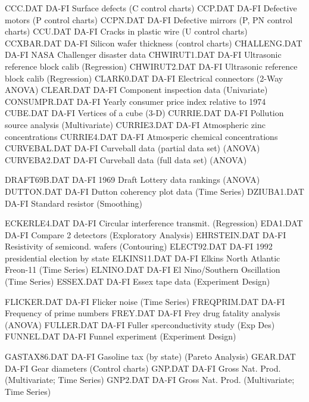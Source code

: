CCC.DAT                     DA-FI Surface defects (C control charts)
CCP.DAT                     DA-FI Defective motors (P control charts)
CCPN.DAT                    DA-FI Defective mirrors (P, PN control charts)
CCU.DAT                     DA-FI Cracks in plastic wire (U control charts)
CCXBAR.DAT                  DA-FI Silicon wafer thickness (control charts)
CHALLENG.DAT                DA-FI NASA Challenger disaster data 
CHWIRUT1.DAT                DA-FI Ultrasonic reference block calib (Regression)
CHWIRUT2.DAT                DA-FI Ultrasonic reference block calib (Regression)
CLARK0.DAT                  DA-FI Electrical connectors (2-Way ANOVA)
CLEAR.DAT                   DA-FI Component inspection data (Univariate)
CONSUMPR.DAT                DA-FI Yearly consumer price index relative to 1974
CUBE.DAT                    DA-FI Vertices of a cube (3-D)
CURRIE.DAT                  DA-FI Pollution source analysis (Multivariate)
CURRIE3.DAT                 DA-FI Atmospheric zinc concentrations
CURRIE4.DAT                 DA-FI Atmosperic chemical concentrations
CURVEBAL.DAT                DA-FI Curveball data (partial data set) (ANOVA)
CURVEBA2.DAT                DA-FI Curveball data (full data set) (ANOVA)

DRAFT69B.DAT                DA-FI 1969 Draft Lottery data rankings (ANOVA)
DUTTON.DAT                  DA-FI Dutton coherency plot data (Time Series)
DZIUBA1.DAT                 DA-FI Standard resistor (Smoothing)

ECKERLE4.DAT                DA-FI Circular interference transmit. (Regression)
EDA1.DAT                    DA-FI Compare 2 detectors (Exploratory Analysis)
EHRSTEIN.DAT                DA-FI Resistivity of semicond. wafers (Contouring)
ELECT92.DAT                 DA-FI 1992 presidential election by state
ELKINS11.DAT                DA-FI Elkins North Atlantic Freon-11 (Time Series)
ELNINO.DAT                  DA-FI El Nino/Southern Oscillation (Time Series)
ESSEX.DAT                   DA-FI Essex tape data (Experiment Design)

FLICKER.DAT                 DA-FI Flicker noise (Time Series)
FREQPRIM.DAT                DA-FI Frequency of prime numbers
FREY.DAT                    DA-FI Frey drug fatality analysis (ANOVA)
FULLER.DAT                  DA-FI Fuller sperconductivity study (Exp Des)
FUNNEL.DAT                  DA-FI Funnel experiment (Experiment Design)

GASTAX86.DAT                DA-FI Gasoline tax (by state) (Pareto Analysis)
GEAR.DAT                    DA-FI Gear diameters (Control charts)
GNP.DAT                     DA-FI Gross Nat. Prod. (Multivariate; Time Series)
GNP2.DAT                    DA-FI Gross Nat. Prod. (Multivariate; Time Series)

